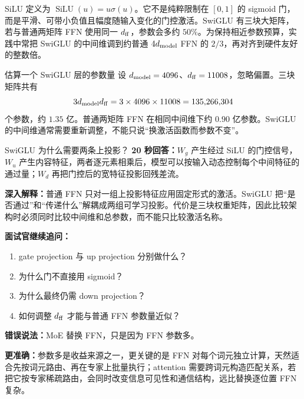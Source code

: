 SiLU 定义为 $\operatorname{SiLU}(u)=u\sigma(u)$。它不是纯粹限制在 $[0,1]$ 的 sigmoid 门，而是平滑、可带小负值且幅度随输入变化的门控激活。SwiGLU 有三块大矩阵，若与普通两矩阵 FFN 使用同一 $d_{\rm ff}$，参数会多约 $50\%$。为保持相近参数预算，实践中常把 SwiGLU 的中间维调到约普通 $4d_{\rm model}$ FFN 的 $2/3$，再对齐到硬件友好的整数倍。

\begin{exercisebox}{估算一个 SwiGLU 层的参数量}
设 $d_{\rm model}=4096$、$d_{\rm ff}=11008$，忽略偏置。三块矩阵共有
\[
3d_{\rm model}d_{\rm ff}
=3\times4096\times11008
=135{,}266{,}304
\]
个参数，约 $1.35$ 亿。普通两矩阵 FFN 在相同中间维下约 $0.90$ 亿参数。SwiGLU 的中间维通常需要重新调整，不能只说“换激活函数而参数不变”。
\end{exercisebox}

\begin{interviewbox}{SwiGLU 为什么需要两条上投影？}
\textbf{20 秒回答：}$W_g$ 产生经过 SiLU 的门控信号，$W_u$ 产生内容特征，两者逐元素相乘后，模型可以按输入动态控制每个中间特征的通过量；$W_d$ 再把门控后的宽特征投影回残差流。

\textbf{深入解释：}普通 FFN 只对一组上投影特征应用固定形式的激活。SwiGLU 把“是否通过”和“传递什么”解耦成两组可学习投影。代价是三块权重矩阵，因此比较架构时必须同时比较中间维和总参数，而不能只比较激活名称。

\textbf{面试官继续追问：}
\begin{enumerate}
  \item gate projection 与 up projection 分别做什么？
  \item 为什么门不直接用 sigmoid？
  \item 为什么最终仍需 down projection？
  \item 如何调整 $d_{\rm ff}$ 才能与普通 FFN 参数量近似？
\end{enumerate}
\end{interviewbox}

\begin{wrongbox}
\textbf{错误说法：}MoE 替换 FFN，只是因为 FFN 参数多。

\textbf{更准确：}参数多是收益来源之一，更关键的是 FFN 对每个词元独立计算，天然适合先按词元路由、再在专家上批量执行；attention 需要跨词元构造匹配关系，若把它按专家稀疏路由，会同时改变信息可见性和通信结构，远比替换逐位置 FFN 复杂。
\end{wrongbox}


